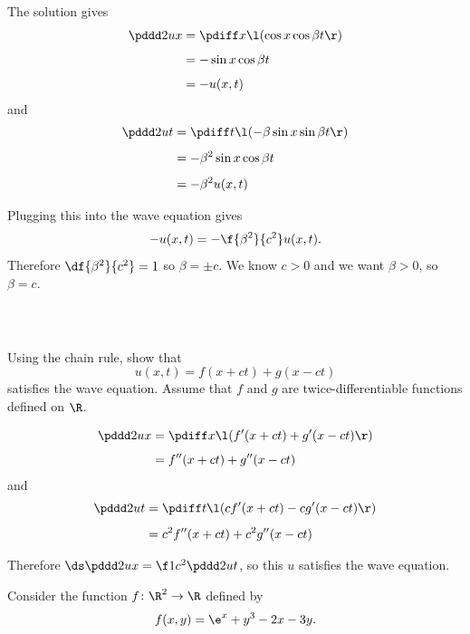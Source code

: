 \documentclass[a4paper]{article}
\begin{document}
The solution gives \begin{align*}
\pddd 2ux &= \pdiff x \l( \cos x \cos \beta t \r) \\[1ex]
&= -\sin x \cos \beta t \\[1ex]
&= -u(x, t)
\end{align*}
and \begin{align*}
\pddd 2ut &= \pdiff t \l( -\beta \sin x \sin \beta t \r) \\[1ex]
&= -\beta^2 \sin x \cos \beta t \\[1ex]
&= -\beta^2 u(x, t)
\end{align*}

Plugging this into the wave equation gives \[
-u(x, t) = -\f{\beta^2}{c^2} u(x, t).
\] Therefore $\df{\beta^2}{c^2} = 1$ so $\beta = \pm c$. We know $c > 0$ and we want $\beta > 0$, so $\beta = c$.

\subsubsection{~} %

\begin{questionbody}
Using the chain rule, show that \[
u(x, t) = f(x + ct) + g(x - ct)
\] satisfies the wave equation. Assume that $f$ and $g$ are twice-differentiable functions defined on $\R$.
\end{questionbody}

\begin{align*}
\pddd 2ux &= \pdiff x \l( f'(x+ct) + g'(x-ct) \r)\\[1ex]
&= f''(x+ct) + g''(x-ct)
\end{align*}
and \begin{align*}
\pddd 2ut &= \pdiff t \l( c f'(x+ct) - c g'(x-ct) \r)\\[1ex]
&= c^2 f''(x+ct) + c^2 g''(x-ct)
\end{align*}

Therefore $\ds \pddd 2ux = \f1{c^2} \pddd 2ut$, so this $u$ satisfies the wave equation.


\begin{questionbody}
Consider the function $f \colon \R^2 \to \R$ defined by \[
f(x, y) = \e^x + y^3 - 2x - 3y.
\]
\end{questionbody}

\subsection{~} %
\end{document}

